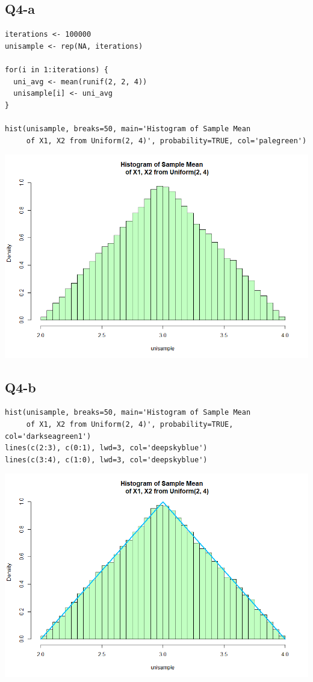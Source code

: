 \documentclass[12pt,letterpaper]{article}
\begin{document}
\subsection*{Q4-a}

\begin{verbatim}
iterations <- 100000
unisample <- rep(NA, iterations)

for(i in 1:iterations) {
  uni_avg <- mean(runif(2, 2, 4))
  unisample[i] <- uni_avg
}

hist(unisample, breaks=50, main='Histogram of Sample Mean 
     of X1, X2 from Uniform(2, 4)', probability=TRUE, col='palegreen')
\end{verbatim}

\includegraphics[width=150mm]{hist_unif.png}

\newpage

\subsection*{Q4-b}

\begin{verbatim}
hist(unisample, breaks=50, main='Histogram of Sample Mean 
     of X1, X2 from Uniform(2, 4)', probability=TRUE, col='darkseagreen1')
lines(c(2:3), c(0:1), lwd=3, col='deepskyblue')
lines(c(3:4), c(1:0), lwd=3, col='deepskyblue')
\end{verbatim}

\includegraphics[width=150mm]{hist_with_dencurve.png}

\end{document}
